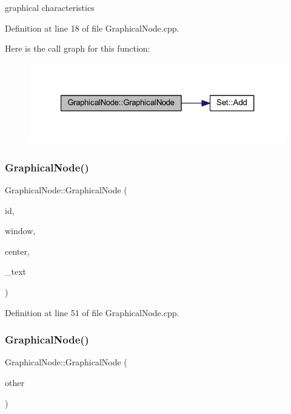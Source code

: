 graphical characteristics 

Definition at line 18 of file Graphical\+Node.\+cpp.

Here is the call graph for this function\+:
\nopagebreak
\begin{figure}[H]
\begin{center}
\leavevmode
\includegraphics[width=321pt]{class_graphical_node_a8b6df5a7f16ea432b12b54c13d893e36_cgraph}
\end{center}
\end{figure}
\mbox{\label{class_graphical_node_a738f88bed48b5089d795f8778f984cc6}} 
\subsubsection{\texorpdfstring{Graphical\+Node()}{GraphicalNode()}\hspace{0.1cm}{\footnotesize\ttfamily [4/5]}}
{\footnotesize\ttfamily Graphical\+Node\+::\+Graphical\+Node (\begin{DoxyParamCaption}\item[{\hyperlink{_graphical_element_8h_ade5fd6c85839a416577ff9de1605141e}{Element\+Key}}]{id,  }\item[{wx\+Window $\ast$}]{window,  }\item[{wx\+Point2\+D\+Double}]{center,  }\item[{const std\+::string \&}]{\+\_\+text }\end{DoxyParamCaption})}



Definition at line 51 of file Graphical\+Node.\+cpp.

\mbox{\label{class_graphical_node_a63c2c7ac34c3f9b3a1383dd157cf731c}} 
\subsubsection{\texorpdfstring{Graphical\+Node()}{GraphicalNode()}\hspace{0.1cm}{\footnotesize\ttfamily [5/5]}}
{\footnotesize\ttfamily Graphical\+Node\+::\+Graphical\+Node (\begin{DoxyParamCaption}\item[{const \hyperlink{class_graphical_node}{Graphical\+Node} \&}]{other }\end{DoxyParamCaption})}



